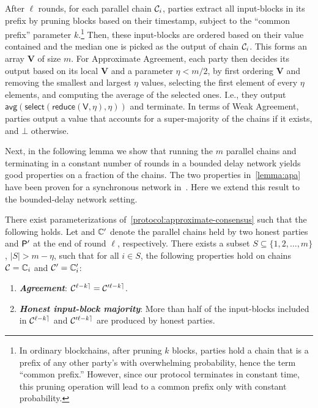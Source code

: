 After $\ell$ rounds, for each parallel chain $\mathcal{C}_i$, parties extract all input-blocks in its prefix by pruning blocks based on their timestamp, subject to the ``common prefix'' parameter $k$.\footnote{In ordinary blockchains, after pruning $k$ blocks, parties hold a chain that is a prefix of any other party's with overwhelming probability, hence the term ``common prefix.'' However, since our protocol terminates in constant time, this pruning operation will lead to a common prefix only with constant probability.}
%
Then, these input-blocks are ordered based on their value contained and the median one is picked as the output of chain $\mathcal{C}_i$.
%
This forms an array $\mathbf{V}$ of size $m$.
%
For Approximate Agreement, each party then decides its output based on its local $\mathbf{V}$ and a parameter $\eta < m / 2$, by first ordering $\mathbf{V}$ and removing the smallest and largest $\eta$ values, selecting the first element of every $\eta$ elements, and computing the average of the selected ones.
%
I.e., they output $\textsf{avg}(\mathsf{select}(\mathsf{reduce}(\mathsf{V}, \eta), \eta))$ and terminate.
%
In terms of Weak Agreement, parties output a value that accounts for a super-majority of the chains if it exists, and $\mathcal{\bot}$ otherwise.



Next, in the following lemma we show that running the $m$ parallel chains and terminating in a constant number of rounds in a bounded delay network yields good properties on a fraction of the chains.
%
The two properties in~\cref{lemma:apa} have been proven for a synchronous network in~\cite{EC:GarKiaShe24}.
%
Here we extend this result to the bounded-delay network setting.

\begin{lemma} \label{lemma:apa}
    There exist parameterizations of~\cref{protocol:approximate-consensus} such that the following holds.
    Let \parallelChains and $\mathbb{C}'$ denote the parallel chains held by two honest parties \party and $\mathsf{P}'$ at the end of round $\ell$, respectively.
    There exists a subset $S \subseteq \{1, 2, \ldots, m \}$, $|S| > m - \eta$, such that for all $i \in S$, the following properties hold on chains $\mathcal{C} = \mathbb{C}_i$ and $\mathcal{C}' = \mathbb{C}'_i$:
    \begin{enumerate}[label=\FlatSteel, leftmargin=*, nosep]
        \item \emph{\bf Agreement}: $\mathcal{C}^{{\ell - k}\rceil} = \mathcal{C}'^{{\ell - k}\rceil}$.

        \item \emph{\bf Honest input-block majority}: More than half of the input-blocks included in $\mathcal{C}^{{\ell - k}\rceil}$ and $\mathcal{C}'^{{\ell - k}\rceil}$ are produced by honest parties.
    \end{enumerate}
\end{lemma}

